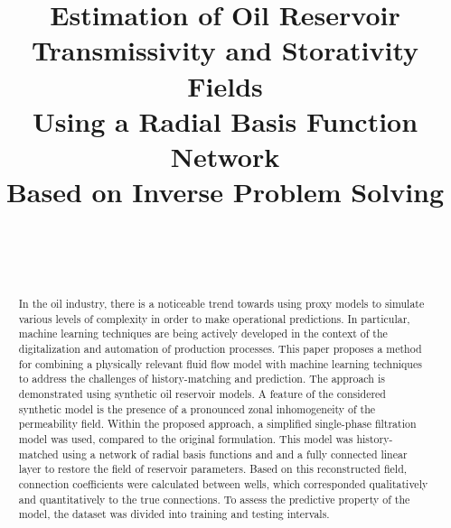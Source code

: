 \documentclass[
11pt,%
tightenlines,%
twoside,%
onecolumn,%
nofloats,%
nobibnotes,%
nofootinbib,%
superscriptaddress,%
noshowpacs,%
centertags]%
{revtex4}
\begin{document}

\title{Estimation of Oil Reservoir \\ Transmissivity and Storativity Fields \\ Using a Radial Basis Function Network \\ Based on Inverse Problem Solving}

\author{~}


\author{~}




\begin{abstract} %
In the oil industry, there is a noticeable trend towards using proxy models to simulate various levels of complexity in order to make operational predictions. In particular, machine learning techniques are being actively developed in the context of the digitalization and automation of production processes.
This paper proposes a method for combining a physically relevant fluid flow model with machine learning techniques to address the challenges of history-matching and prediction. The approach is demonstrated using synthetic oil reservoir models.
A feature of the considered synthetic model is the presence of a pronounced zonal inhomogeneity of the permeability field. 
Within the proposed approach, a simplified single-phase filtration model was used, compared to the original formulation. This model was history-matched using a network of radial basis functions and  and a fully connected linear layer to restore the field of reservoir parameters. Based on this reconstructed field, connection coefficients were calculated between wells, which corresponded qualitatively and quantitatively to the true connections. To assess the predictive property of the model, the dataset was divided into training and testing intervals.
\end{abstract}
\end{document}
